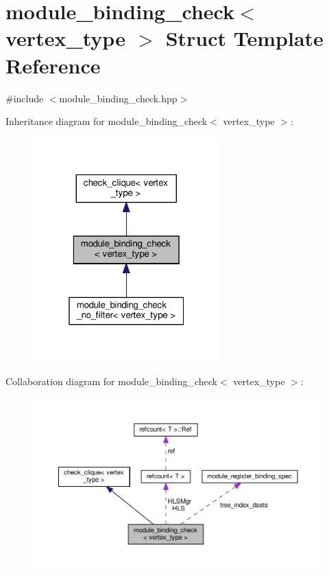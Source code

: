 \hypertarget{structmodule__binding__check}{}\section{module\+\_\+binding\+\_\+check$<$ vertex\+\_\+type $>$ Struct Template Reference}
\label{structmodule__binding__check}


{\ttfamily \#include $<$module\+\_\+binding\+\_\+check.\+hpp$>$}



Inheritance diagram for module\+\_\+binding\+\_\+check$<$ vertex\+\_\+type $>$\+:
\nopagebreak
\begin{figure}[H]
\begin{center}
\leavevmode
\includegraphics[width=205pt]{d7/d5f/structmodule__binding__check__inherit__graph}
\end{center}
\end{figure}


Collaboration diagram for module\+\_\+binding\+\_\+check$<$ vertex\+\_\+type $>$\+:
\nopagebreak
\begin{figure}[H]
\begin{center}
\leavevmode
\includegraphics[width=350pt]{dc/d06/structmodule__binding__check__coll__graph}
\end{center}
\end{figure}
